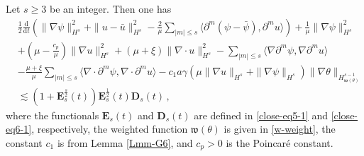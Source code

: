 \documentclass[10pt,a4paper]{amsart}
\def\d{\mathrm{d}}
\def\w{\mathfrak{w}}
\begin{document}
\begin{lemma}\label{Lmm-G7}
  Let $s \ge 3$ be an integer. Then one has
\begin{equation}\label{gpsi-eq-estimate}
\begin{aligned}
& \frac{1}{2} \frac{\d}{\d t} \left( \| \nabla \psi\|_{H^s}^2 + \|u - \bar{u}\|_{H^s}^2 - \frac{2}{\mu} \sum_{|m| \leq s} \langle \partial^m (\psi - \bar{\psi}), \partial^m u \rangle \right) + \frac{1}{\mu} \|\nabla \psi\|_{H^s}^2 \\
& + ( \mu - \frac{c_p}{\mu} ) \|\nabla u\|_{H^s}^2 + (\mu + \xi) \|\nabla \cdot u\|_{H^s}^2 - \sum_{|m| \leq s} \langle \nabla \partial^m \psi, \nabla \partial^m u \rangle \\
& - \frac{\mu + \xi}{\mu} \sum_{|m| \leq s} \langle \nabla \cdot \partial^m \psi, \nabla \cdot \partial^m u \rangle - c_1 a \gamma ( \mu \| \nabla u \|_{H^s} + \| \nabla \psi \|_{H^s} ) \| \nabla \theta \|_{H^{s-1}_{ \w (\theta) }} \\
& \lesssim \left( 1 + \mathbf{E}_s^\frac{s}{2} (t) \right) \mathbf{E}_s^\frac{1}{2} (t) \mathbf{D}_s (t) \,,
\end{aligned}
\end{equation}
where the functionals $\mathbf{E}_s (t)$ and $\mathbf{D}_s (t)$ are defined  in \eqref{close-eq5-1} and \eqref{close-eq6-1}, respectively, the weighted function $\w (\theta)$ is given in \eqref{w-weight}, the constant $c_1$ is from Lemma \ref{Lmm-G6}, and $c_p > 0$ is the Poincar\'e constant.
\end{lemma}
\end{document}
